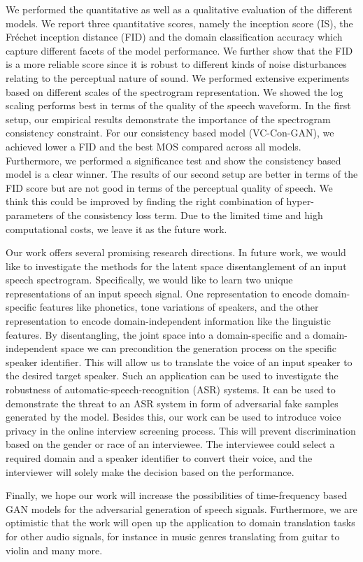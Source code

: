 We performed the quantitative as well as a qualitative evaluation of the different models. We report three quantitative scores, namely the inception score (IS), the Fr\'echet inception distance (FID) and the domain classification accuracy which capture different facets of the model performance. We further show that the FID is a more reliable score since it is robust to different kinds of noise disturbances relating to the perceptual nature of sound. We performed extensive experiments based on different scales of the spectrogram representation. We showed the log scaling performs best in terms of the quality of the speech waveform. In the first setup, our empirical results demonstrate the importance of the spectrogram consistency constraint. For our consistency based model (VC-Con-GAN), we achieved lower a FID and the best MOS compared across all models. Furthermore, we performed a significance test and show the consistency based model is a clear winner. The results of our second setup are better in terms of the FID score but are not good in terms of the perceptual quality of speech. We think this could be improved by finding the right combination of hyper-parameters of the consistency loss term. Due to the limited time and high computational costs, we leave it as the future work.

Our work offers several promising research directions. In future work, we would like to investigate the methods for the latent space disentanglement of an input speech spectrogram. Specifically, we would like to learn two unique representations of an input speech signal. One representation to encode domain-specific features like phonetics, tone variations of speakers, and the other representation to encode domain-independent information like the linguistic features. By disentangling, the joint space into a domain-specific and a domain-independent space we can precondition the generation process on the specific speaker identifier. This will allow us to translate the voice of an input speaker to the desired target speaker. Such an application can be used to investigate the robustness of automatic-speech-recognition (ASR) systems. It can be used to demonstrate the threat to an ASR system in form of adversarial fake samples generated by the model. Besides this, our work can be used to introduce voice privacy in the online interview screening process. This will prevent discrimination based on the gender or race of an interviewee. The interviewee could select a required domain and a speaker identifier to convert their voice, and the interviewer will solely make the decision based on the performance.

Finally, we hope our work will increase the possibilities of time-frequency based GAN models for the adversarial generation of speech signals. Furthermore, we are optimistic that the work will open up the application to domain translation tasks for other audio signals, for instance in music genres translating from guitar to violin and many more.  
